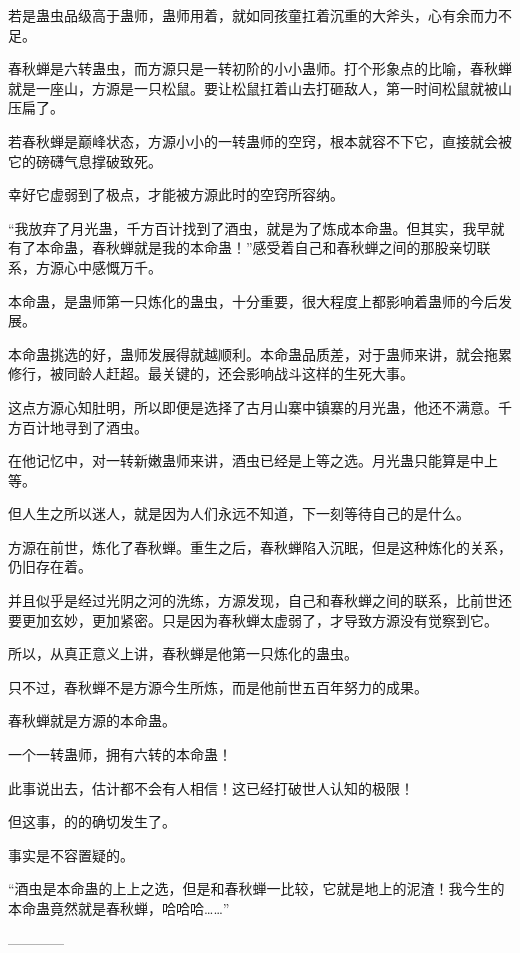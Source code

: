 \begin{this_body}
若是蛊虫品级高于蛊师，蛊师用着，就如同孩童扛着沉重的大斧头，心有余而力不足。

春秋蝉是六转蛊虫，而方源只是一转初阶的小小蛊师。打个形象点的比喻，春秋蝉就是一座山，方源是一只松鼠。要让松鼠扛着山去打砸敌人，第一时间松鼠就被山压扁了。

若春秋蝉是巅峰状态，方源小小的一转蛊师的空窍，根本就容不下它，直接就会被它的磅礴气息撑破致死。

幸好它虚弱到了极点，才能被方源此时的空窍所容纳。

“我放弃了月光蛊，千方百计找到了酒虫，就是为了炼成本命蛊。但其实，我早就有了本命蛊，春秋蝉就是我的本命蛊！”感受着自己和春秋蝉之间的那股亲切联系，方源心中感慨万千。

本命蛊，是蛊师第一只炼化的蛊虫，十分重要，很大程度上都影响着蛊师的今后发展。

本命蛊挑选的好，蛊师发展得就越顺利。本命蛊品质差，对于蛊师来讲，就会拖累修行，被同龄人赶超。最关键的，还会影响战斗这样的生死大事。

这点方源心知肚明，所以即便是选择了古月山寨中镇寨的月光蛊，他还不满意。千方百计地寻到了酒虫。

在他记忆中，对一转新嫩蛊师来讲，酒虫已经是上等之选。月光蛊只能算是中上等。

但人生之所以迷人，就是因为人们永远不知道，下一刻等待自己的是什么。

方源在前世，炼化了春秋蝉。重生之后，春秋蝉陷入沉眠，但是这种炼化的关系，仍旧存在着。

并且似乎是经过光阴之河的洗练，方源发现，自己和春秋蝉之间的联系，比前世还要更加玄妙，更加紧密。只是因为春秋蝉太虚弱了，才导致方源没有觉察到它。

所以，从真正意义上讲，春秋蝉是他第一只炼化的蛊虫。

只不过，春秋蝉不是方源今生所炼，而是他前世五百年努力的成果。

春秋蝉就是方源的本命蛊。

一个一转蛊师，拥有六转的本命蛊！

此事说出去，估计都不会有人相信！这已经打破世人认知的极限！

但这事，的的确切发生了。

事实是不容置疑的。

“酒虫是本命蛊的上上之选，但是和春秋蝉一比较，它就是地上的泥渣！我今生的本命蛊竟然就是春秋蝉，哈哈哈……”

------------

\end{this_body}

